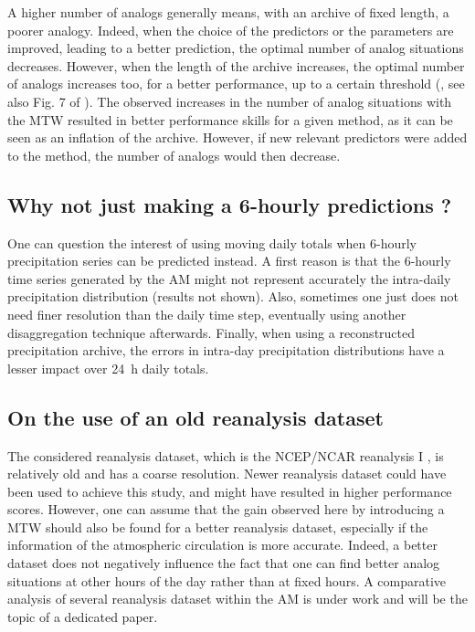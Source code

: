 \documentclass[hess, manuscript]{copernicus}
\begin{document}
A higher number of analogs generally means, with an archive of fixed length, a poorer analogy. Indeed, when the choice of the predictors or the parameters are improved, leading to a better prediction, the optimal number of analog situations decreases. However, when the length of the archive increases, the optimal number of analogs increases too, for a better performance, up to a certain threshold (\citealt{Bontron2004}, see also Fig. 7 of \citealt{Hamill2006a}). The observed increases in the number of analog situations with the MTW resulted in better performance skills for a given method, as it can be seen as an inflation of the archive. However, if new relevant predictors were added to the method, the number of analogs would then decrease.


\subsection{Why not just making a 6-hourly predictions ?}

One can question the interest of using moving daily totals when 6-hourly precipitation series can be predicted instead. A first reason is that the 6-hourly time series generated by the AM might not represent accurately the intra-daily precipitation distribution (results not shown). Also, sometimes one just does not need finer resolution than the daily time step, eventually using another disaggregation technique afterwards. Finally, when using a reconstructed precipitation archive, the errors in intra-day precipitation distributions have a lesser impact over 24~h daily totals.


\subsection{On the use of an old reanalysis dataset}
\label{sec:old_reanalysis}

The considered reanalysis dataset, which is the NCEP/NCAR reanalysis I \citep{Kalnay1996}, is relatively old and has a coarse resolution. Newer reanalysis dataset could have been used to achieve this study, and might have resulted in higher performance scores. However, one can assume that the gain observed here by introducing a MTW should also be found for a better reanalysis dataset, especially if the information of the atmospheric circulation is more accurate. Indeed, a better dataset does not negatively influence the fact that one can find better analog situations at other hours of the day rather than at fixed hours. A comparative analysis of several reanalysis dataset within the AM is under work and will be the topic of a dedicated paper.
\end{document}
